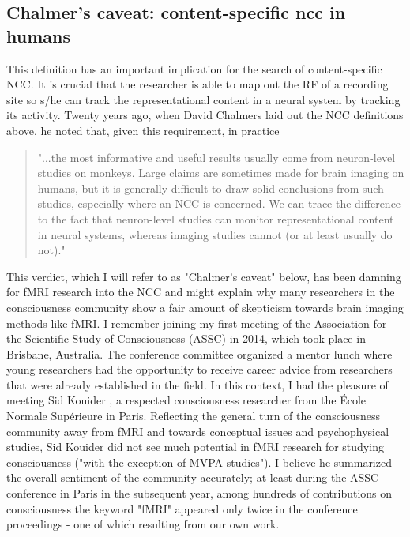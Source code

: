 \subsection{Chalmer's caveat: content-specific ncc in humans}
This definition has an important implication for the search of content-specific NCC. It is crucial that the researcher is able to map out the RF of a recording site so s/he can track the representational content in a neural system by tracking its activity. Twenty years ago, when David Chalmers laid out the NCC definitions above, he noted that, given this requirement, in practice

\begin{quotation}
"...the most informative and useful results usually come from neuron-level studies on monkeys. Large claims are sometimes made for brain imaging on humans, but it is generally difficult to draw solid conclusions from such studies, especially where an NCC is concerned. We can trace the difference to the fact that neuron-level studies can monitor representational content in neural systems, whereas imaging studies cannot (or at least usually do not)."
\parencite[page 25]{Chalmers2000}
\end{quotation}

This verdict, which I will refer to as "Chalmer's caveat" below, has been damning for fMRI research into the NCC and might explain why many researchers in the consciousness community show a fair amount of skepticism towards brain imaging methods like fMRI. I remember joining my first meeting of the Association for the Scientific Study of Consciousness (ASSC) in 2014, which took place in Brisbane, Australia. The conference committee organized a mentor lunch where young researchers had the opportunity to receive career advice from researchers that were already established in the field. In this context, I had the pleasure of meeting Sid Kouider \parencite{Kouider2010}, a respected consciousness researcher from the École Normale Supérieure in Paris. Reflecting the general turn of the consciousness community away from fMRI and towards conceptual issues and psychophysical studies, Sid Kouider did not see much potential in fMRI research for studying consciousness ("with the exception of MVPA studies"). I believe he summarized the overall sentiment of the community accurately; at least during the ASSC conference in Paris in the subsequent year, among hundreds of contributions on consciousness the keyword "fMRI" appeared only twice in the conference proceedings - one of which resulting from our own work.

